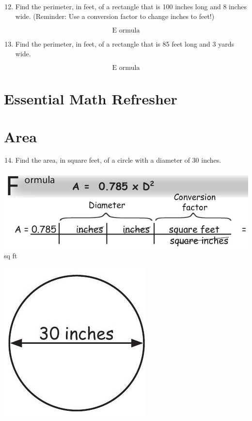 \documentclass[10pt]{article}
\begin{document}
\begin{enumerate}
  \setcounter{enumi}{11}
  \item Find the perimeter, in feet, of a rectangle that is 100 inches long and 8 inches wide. (Reminder: Use a conversion factor to change inches to feet!)
\end{enumerate}
$$
\text { E ormula }
$$

\begin{enumerate}
  \setcounter{enumi}{12}
  \item Find the perimeter, in feet, of a rectangle that is 85 feet long and 3 yards wide.
\end{enumerate}
$$
\text { E ormula }
$$

\section{Essential Math Refresher}
\section{Area}
\begin{enumerate}
  \setcounter{enumi}{13}
  \item Find the area, in square feet, of a circle with a diameter of 30 inches.
\end{enumerate}
\includegraphics[max width=\textwidth]{2022_09_16_4d34b76b97ee13a67df7g-20}\\
sq ft

\includegraphics[max width=\textwidth]{2022_09_16_4d34b76b97ee13a67df7g-20(1)}
\end{document}
